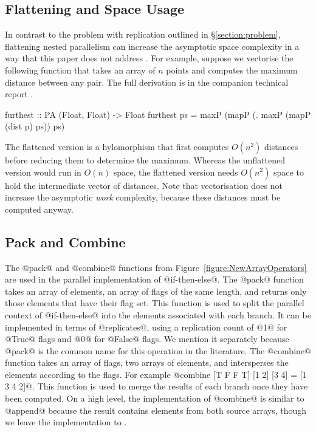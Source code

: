 \subsection{Flattening and Space Usage}
\label{section:SpaceUsage}
In contrast to the problem with replication outlined in \S\ref{section:problem}, flattening nested parallelism can increase the asymptotic space complexity in a way that this paper does not address \cite{palmer:piecewise, spoonhower-etal:space-profiling}. For example, suppose we vectorise the following function that takes an array of $n$ points and computes the maximum distance between any pair. The full derivation is in the companion technical report \cite{lippmeier-etal:replicate-tr}.
%
\begin{small}
\begin{code}
furthest :: PA (Float, Float) -> Float
furthest ps = maxP (mapP (\p. maxP (mapP (dist p) ps)) ps)
\end{code}
\end{small}
%
The flattened version is a hylomorphism that first computes $O(n^2)$ distances before reducing them to determine the maximum. Whereas the unflattened version would run in $O(n)$ space, the flattened version needs $O(n^2)$ space to hold the intermediate vector of distances. Note that vectorisation does not increase the asymptotic \emph{work} complexity, because these distances must be computed anyway. 


\subsection{Pack and Combine}
\label{section:PackCombine}
The @pack@ and @combine@ functions from Figure~\ref{figure:NewArrayOperators} are used in the parallel implementation of @if-then-else@. The @pack@ function takes an array of elements, an array of flags of the same length, and returns only those elements that have their flag set. This function is used to split the parallel context of @if-then-else@ into the elements associated with each branch. It can be implemented in terms of @replicates@, using a replication count of  @1@ for @True@ flags and @0@ for @False@ flags. We mention it separately because @pack@ is the common name for this operation in the literature. The @combine@ function takes an array of flags, two arrays of elements, and intersperses the elements according to the flags. For example @combine [T F F T] [1 2] [3 4] = [1 3 4 2]@. This function is used to merge the results of each branch once they have been computed. On a high level, the implementation of @combine@ is similar to @append@ because the result contains elements from both source arrays, though we leave the implementation to \cite{lippmeier-etal:replicate-tr}.

